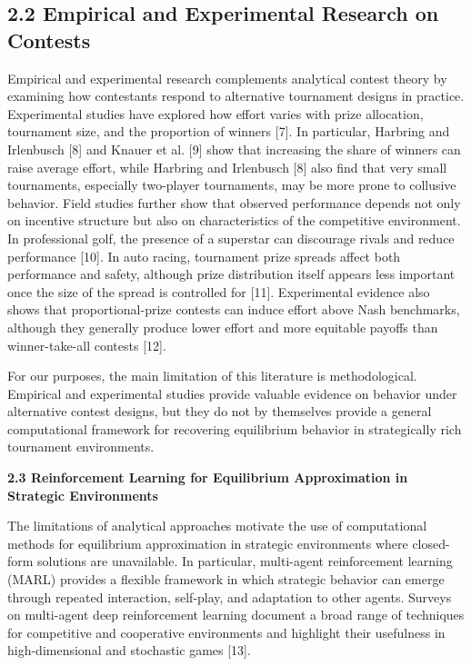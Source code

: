 \documentclass[
]{article}
\begin{document}
\subsection{\texorpdfstring{\textbf{2.2 Empirical and Experimental
Research on
Contests}}{2.2 Empirical and Experimental Research on Contests}}\label{empirical-and-experimental-research-on-contests}

Empirical and experimental research complements analytical contest
theory by examining how contestants respond to alternative tournament
designs in practice. Experimental studies have explored how effort
varies with prize allocation, tournament size, and the proportion of
winners {[}7{]}. In particular, Harbring and Irlenbusch {[}8{]} and
Knauer et al. {[}9{]} show that increasing the share of winners can
raise average effort, while Harbring and Irlenbusch {[}8{]} also find
that very small tournaments, especially two-player tournaments, may be
more prone to collusive behavior. Field studies further show that
observed performance depends not only on incentive structure but also on
characteristics of the competitive environment. In professional golf,
the presence of a superstar can discourage rivals and reduce performance
{[}10{]}. In auto racing, tournament prize spreads affect both
performance and safety, although prize distribution itself appears less
important once the size of the spread is controlled for {[}11{]}.
Experimental evidence also shows that proportional-prize contests can
induce effort above Nash benchmarks, although they generally produce
lower effort and more equitable payoffs than winner-take-all contests
{[}12{]}.

For our purposes, the main limitation of this literature is
methodological. Empirical and experimental studies provide valuable
evidence on behavior under alternative contest designs, but they do not
by themselves provide a general computational framework for recovering
equilibrium behavior in strategically rich tournament environments.

\textbf{2.3 Reinforcement Learning for Equilibrium Approximation in
Strategic Environments}

The limitations of analytical approaches motivate the use of
computational methods for equilibrium approximation in strategic
environments where closed-form solutions are unavailable. In particular,
multi-agent reinforcement learning (MARL) provides a flexible framework
in which strategic behavior can emerge through repeated interaction,
self-play, and adaptation to other agents. Surveys on multi-agent deep
reinforcement learning document a broad range of techniques for
competitive and cooperative environments and highlight their usefulness
in high-dimensional and stochastic games {[}13{]}.
\end{document}
